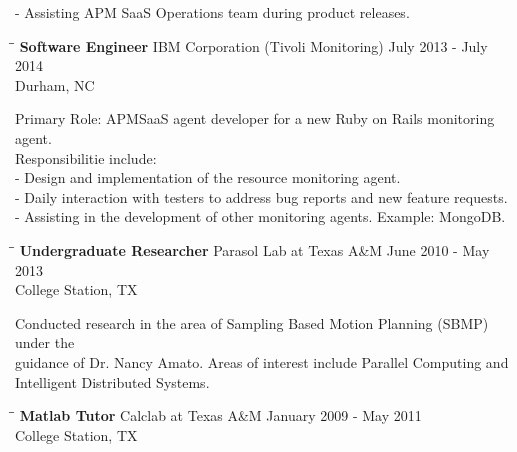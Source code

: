 \documentclass[8pt]{res}
\begin{document}
\begin{resume}
    - Assisting APM SaaS Operations team during product releases.
    \begin{tabbing}
      \hspace{2.3in}\= \hspace{2.6in}\= \kill %
      \textbf{Software Engineer} \>IBM Corporation (Tivoli Monitoring) \>July 2013 - July 2014\\ \>Durham, NC
    \end{tabbing}\vspace{-20pt}      %
    Primary Role: APMSaaS agent developer for a new Ruby on Rails monitoring agent.\\
    Responsibilitie include:\\
    - Design and implementation of the resource monitoring agent.\\
    - Daily interaction with testers to address bug reports and new feature requests.\\
    - Assisting in the development of other monitoring agents. Example: MongoDB.
    \begin{tabbing}
      \hspace{2.3in}\= \hspace{2.6in}\= \kill %
      \textbf{Undergraduate Researcher} \>Parasol Lab at Texas A\&M \>June 2010 - May 2013\\ \>College Station, TX
    \end{tabbing}\vspace{-20pt}      %
    Conducted research in the area of Sampling Based Motion Planning (SBMP) under the\\
    guidance of Dr. Nancy Amato.  Areas of interest include Parallel Computing and\\
    Intelligent Distributed Systems.
    \pagebreak %
    \begin{tabbing}
      \hspace{2.3in}\= \hspace{2.6in}\= \kill %
      \textbf{Matlab Tutor} \>Calclab at Texas A\&M \>January 2009 - May 2011\\ \>College Station, TX

\end{tabbing}
\end{resume}
\end{document}
